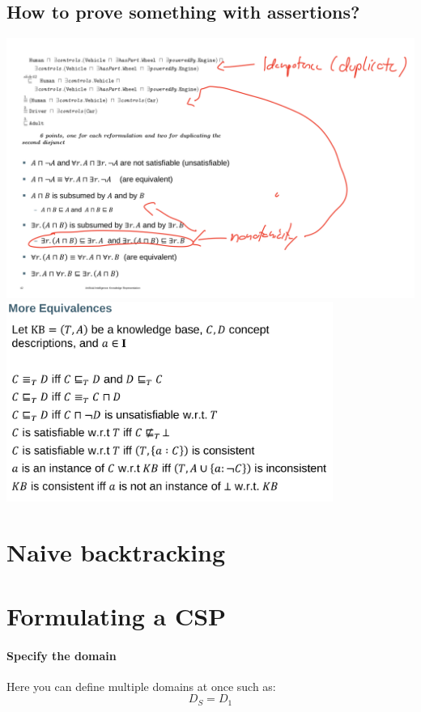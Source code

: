\documentclass[conference]{styles/acmsiggraph}
\newcommand\subsubsubsection{\paragraph}
\begin{document}
\subsection{How to prove something with assertions?}
\includegraphics[width=\textwidth]{imgs/equiv.png}
\includegraphics[width=0.8\textwidth]{imgs/equiv2.png}



\section{Naive backtracking}

\section{Formulating a CSP}

\subsubsubsection{Specify the domain}

Here you can define multiple domains at once such as:
$$D_S = D_1$$


\end{document}
